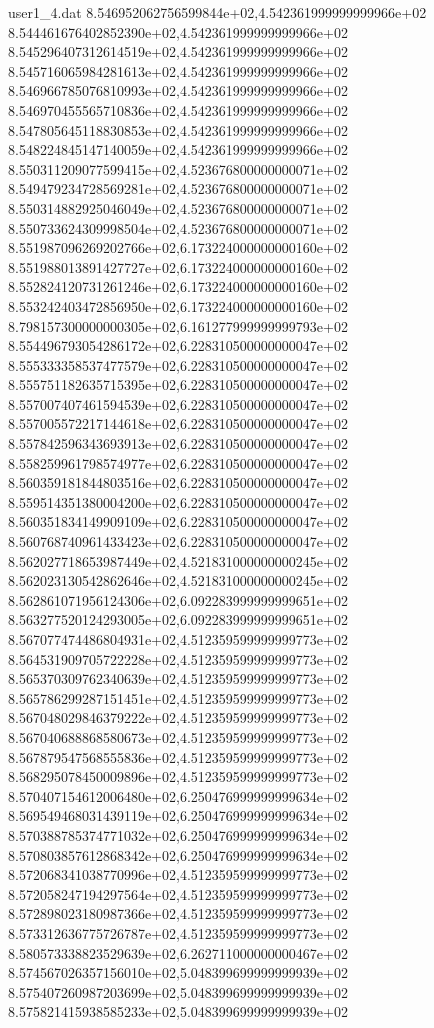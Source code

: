 \begin{filecontents}{user1_4.dat}
8.546952062756599844e+02,4.542361999999999966e+02
8.544461676402852390e+02,4.542361999999999966e+02
8.545296407312614519e+02,4.542361999999999966e+02
8.545716065984281613e+02,4.542361999999999966e+02
8.546966785076810993e+02,4.542361999999999966e+02
8.546970455565710836e+02,4.542361999999999966e+02
8.547805645118830853e+02,4.542361999999999966e+02
8.548224845147140059e+02,4.542361999999999966e+02
8.550311209077599415e+02,4.523676800000000071e+02
8.549479234728569281e+02,4.523676800000000071e+02
8.550314882925046049e+02,4.523676800000000071e+02
8.550733624309998504e+02,4.523676800000000071e+02
8.551987096269202766e+02,6.173224000000000160e+02
8.551988013891427727e+02,6.173224000000000160e+02
8.552824120731261246e+02,6.173224000000000160e+02
8.553242403472856950e+02,6.173224000000000160e+02
8.798157300000000305e+02,6.161277999999999793e+02
8.554496793054286172e+02,6.228310500000000047e+02
8.555333358537477579e+02,6.228310500000000047e+02
8.555751182635715395e+02,6.228310500000000047e+02
8.557007407461594539e+02,6.228310500000000047e+02
8.557005572217144618e+02,6.228310500000000047e+02
8.557842596343693913e+02,6.228310500000000047e+02
8.558259961798574977e+02,6.228310500000000047e+02
8.560359181844803516e+02,6.228310500000000047e+02
8.559514351380004200e+02,6.228310500000000047e+02
8.560351834149909109e+02,6.228310500000000047e+02
8.560768740961433423e+02,6.228310500000000047e+02
8.562027718653987449e+02,4.521831000000000245e+02
8.562023130542862646e+02,4.521831000000000245e+02
8.562861071956124306e+02,6.092283999999999651e+02
8.563277520124293005e+02,6.092283999999999651e+02
8.567077474486804931e+02,4.512359599999999773e+02
8.564531909705722228e+02,4.512359599999999773e+02
8.565370309762340639e+02,4.512359599999999773e+02
8.565786299287151451e+02,4.512359599999999773e+02
8.567048029846379222e+02,4.512359599999999773e+02
8.567040688868580673e+02,4.512359599999999773e+02
8.567879547568555836e+02,4.512359599999999773e+02
8.568295078450009896e+02,4.512359599999999773e+02
8.570407154612006480e+02,6.250476999999999634e+02
8.569549468031439119e+02,6.250476999999999634e+02
8.570388785374771032e+02,6.250476999999999634e+02
8.570803857612868342e+02,6.250476999999999634e+02
8.572068341038770996e+02,4.512359599999999773e+02
8.572058247194297564e+02,4.512359599999999773e+02
8.572898023180987366e+02,4.512359599999999773e+02
8.573312636775726787e+02,4.512359599999999773e+02
8.580573338823529639e+02,6.262711000000000467e+02
8.574567026357156010e+02,5.048399699999999939e+02
8.575407260987203699e+02,5.048399699999999939e+02
8.575821415938585233e+02,5.048399699999999939e+02

\end{filecontents}
